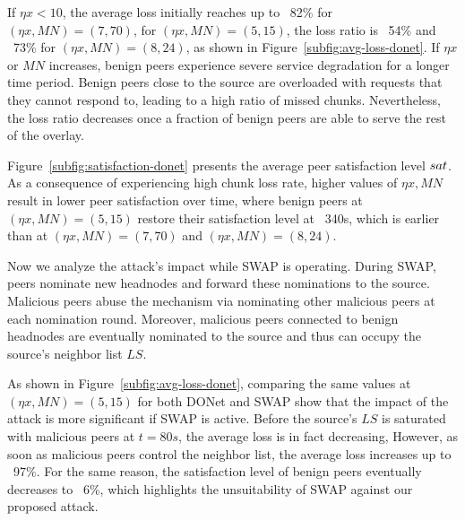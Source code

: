 If $\eta x < 10$, the average loss initially reaches up to ~82\% for $(\eta x, MN)=(7, 70)$, for $(\eta x, MN)=(5, 15)$, the loss ratio is ~54\% and ~73\% for $(\eta x, MN)=(8, 24)$, as shown in Figure~\ref{subfig:avg-loss-donet}.
If $\eta x$ or $MN$ increases, benign peers experience severe service degradation for a longer time period. 
Benign peers close to the source are overloaded with requests that they cannot respond to, leading to a high ratio of missed chunks. 
Nevertheless, the loss ratio decreases once a fraction of benign peers are able to serve the rest of the overlay.

Figure~\ref{subfig:satisfaction-donet} presents the average peer satisfaction level $sat$.
As a consequence of experiencing high chunk loss rate, higher values of $\eta x, MN$ result in lower peer satisfaction over time, where benign peers at $(\eta x, MN)=(5, 15)$ restore their satisfaction level at ~340s, which is earlier than at $(\eta x, MN)=(7, 70)$ and $(\eta x, MN)=(8, 24)$.

Now we analyze the attack's impact while SWAP is operating.
During SWAP, peers nominate new headnodes and forward these nominations to the source. 
Malicious peers abuse the mechanism via nominating other malicious peers at each nomination round. 
Moreover, malicious peers connected to benign headnodes are eventually nominated to the source and thus can occupy the source's neighbor list $LS$. 

As shown in Figure~\ref{subfig:avg-loss-donet}, comparing the same values at $(\eta x, MN)=(5, 15)$ for both DONet and SWAP show that the impact of the attack is more significant if SWAP is active.
Before the source's $LS$ is saturated with malicious peers at $t=80s$, the average loss is in fact decreasing, However, as soon as malicious peers control the neighbor list, the average loss increases up to ~97\%. 
For the same reason, the satisfaction level of benign peers eventually decreases to ~6\%, which highlights the unsuitability of SWAP against our proposed attack.




